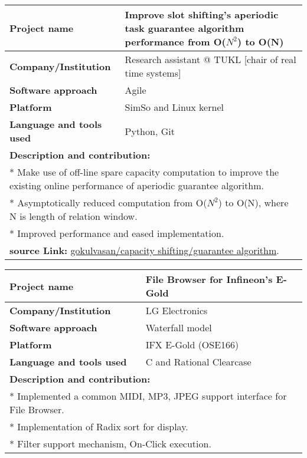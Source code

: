 \documentclass[letterpaper]{twentysecondcv} %
\begin{document}
  \begin{tabular}{ |p{7cm}|p{13cm}| }
 \hline
\rowcolor{sidecolor} 
\textbf{{\large Project name}} & \textbf{ Improve slot shifting's aperiodic task guarantee algorithm performance from O($N^2$) to O(N)}\\[2ex]
 \hline
\rowcolor{sidecolor}
\textbf{{\large Company/Institution}} & Research assistant @ TUKL [chair of real time systems]\\[2ex]
 \hline
 \textbf{{\large Software approach}} & Agile \\[2ex]
 \hline
 \textbf{{\large Platform}} & SimSo  and Linux kernel\\[2ex]
 \hline
  \textbf{{\large Language and tools used}} & Python, Git \\[2ex]
 \hline
 
 \multicolumn{2}{l}{
 \textbf{\large Description and contribution:}} \\[2ex]
 \multicolumn{2}{l}{
 	* Make use of off-line spare capacity computation to improve the existing online performance of aperiodic guarantee algorithm. }\\
  \multicolumn{2}{l}{
  * Asymptotically reduced computation from O($N^2$) to O(N), where N is length of relation window.}\\
 \multicolumn{2}{l}{
 	* Improved performance and eased implementation.}\\
 	
 \multicolumn{2}{l}{
 	{\textcolor{yt} \faGlobe} \textbf{source Link:} \href{https://github.com/gokulvasan/CapacityShifting/blob/master/interval.py\#L303}{gokulvasan/capacity shifting/guarantee algorithm}.
 	}\\
 \hline
 \hline
 \end{tabular}
 
  \vspace{6mm}
  \begin{tabular}{ |p{7cm}|p{13cm}| }
 \hline
\rowcolor{sidecolor} 
\textbf{{\large Project name}} & \textbf{File Browser for Infineon's E-Gold}\\[2ex]
 \hline
\rowcolor{sidecolor}
\textbf{{\large Company/Institution}} & LG Electronics\\[2ex]
 \hline
 \textbf{{\large Software approach}} & Waterfall model \\[2ex]
 \hline
 \textbf{{\large Platform}} & IFX E-Gold (OSE166) \\[2ex]
 \hline
  \textbf{{\large Language and tools used}} & C and Rational Clearcase \\[2ex]
 \hline
 
 \multicolumn{2}{l}{
 \textbf{\large Description and contribution:}} \\[2ex]
 \multicolumn{2}{l}{
 	* Implemented a common MIDI, MP3, JPEG support interface for File Browser.}\\
 \multicolumn{2}{l}{
 	* Implementation of Radix sort for display.}\\
 \multicolumn{2}{l}{
 	* Filter support mechanism, On-Click execution.}\\
 \hline
 \hline
 \end{tabular}
 
\end{document}
